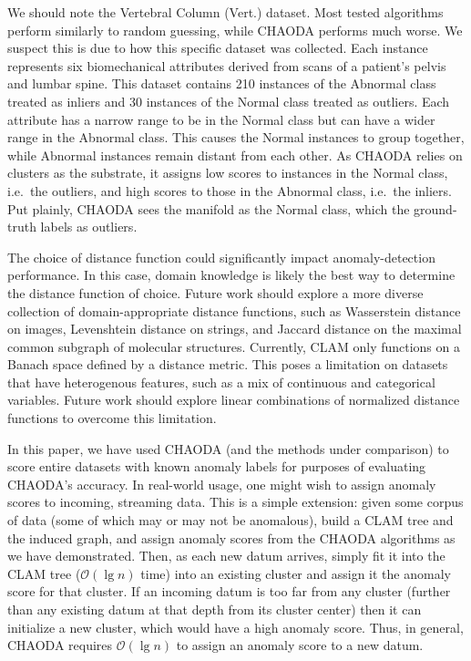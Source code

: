 We should note the Vertebral Column (Vert.) dataset.
Most tested algorithms perform similarly to random guessing, while CHAODA performs much worse.
We suspect this is due to how this specific dataset was collected.
Each instance represents six biomechanical attributes derived from scans of a patient's pelvis and lumbar spine.
This dataset contains 210 instances of the Abnormal class treated as inliers and 30 instances of the Normal class treated as outliers.
Each attribute has a narrow range to be in the Normal class but can have a wider range in the Abnormal class.
This causes the Normal instances to group together, while Abnormal instances remain distant from each other.
As CHAODA relies on clusters as the substrate, it assigns low scores to instances in the Normal class, i.e.\ the outliers, and high scores to those in the Abnormal class, i.e.\ the inliers.
Put plainly, CHAODA sees the manifold as the Normal class, which the ground-truth labels as outliers.

The choice of distance function could significantly impact anomaly-detection performance.
In this case, domain knowledge is likely the best way to determine the distance function of choice.
Future work should explore a more diverse collection of domain-appropriate distance functions, such as Wasserstein distance on images, Levenshtein distance on strings, and Jaccard distance on the maximal common subgraph of molecular structures.
Currently, CLAM only functions on a Banach space defined by a distance metric.
This poses a limitation on datasets that have heterogenous features, such as a mix of continuous and categorical variables.
Future work should explore linear combinations of normalized distance functions to overcome this limitation.

In this paper, we have used CHAODA (and the methods under comparison) to score entire datasets with known anomaly labels for purposes of evaluating CHAODA's accuracy.
In real-world usage, one might wish to assign anomaly scores to incoming, streaming data.
This is a simple extension: given some corpus of data (some of which may or may not be anomalous), build a CLAM tree and the induced graph, and assign anomaly scores from the CHAODA algorithms as we have demonstrated.
Then, as each new datum arrives, simply fit it into the CLAM tree ($\mathcal{O}(\lg n)$ time) into an existing cluster and assign it the anomaly score for that cluster.
If an incoming datum is too far from any cluster (further than any existing datum at that depth from its cluster center) then it can initialize a new cluster, which would have a high anomaly score.
Thus, in general, CHAODA requires $\mathcal{O}(\lg n)$ to assign an anomaly score to a new datum.

